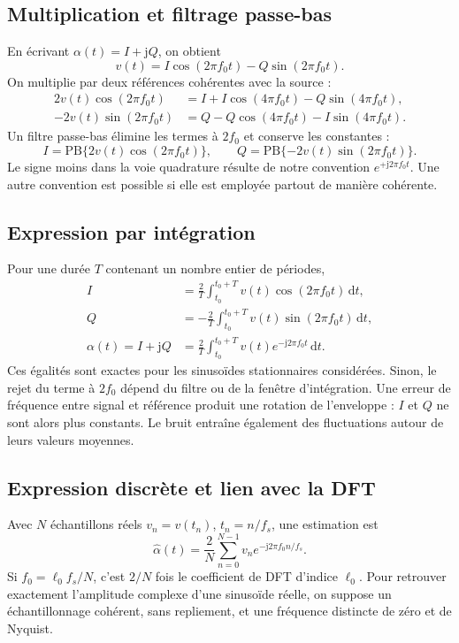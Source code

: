 \documentclass[11pt,a4paper]{article}
\newcommand{\jj}{\mathrm{j}}
\begin{document}
\subsection{Multiplication et filtrage passe-bas}
En écrivant $\alpha(t)=I+\jj Q$, on obtient
\begin{equation}
 v(t)=I\cos(2\pi f_0t)-Q\sin(2\pi f_0t).
\end{equation}
On multiplie par deux références cohérentes avec la source :
\begin{align}
 2v(t)\cos(2\pi f_0t)
 &=I+I\cos(4\pi f_0t)-Q\sin(4\pi f_0t),\\
 -2v(t)\sin(2\pi f_0t)
 &=Q-Q\cos(4\pi f_0t)-I\sin(4\pi f_0t).
\end{align}
Un filtre passe-bas élimine les termes à $2f_0$ et conserve les constantes :
\begin{equation}
 \boxed{I=\mathrm{PB}\{2v(t)\cos(2\pi f_0t)\},\qquad
 Q=\mathrm{PB}\{-2v(t)\sin(2\pi f_0t)\}.}
\end{equation}
Le signe moins dans la voie quadrature résulte de notre convention
$e^{+\jj2\pi f_0t}$. Une autre convention est possible si elle est employée
partout de manière cohérente.

\subsection{Expression par intégration}
Pour une durée $T$ contenant un nombre entier de périodes,
\begin{align}
 I&=\frac{2}{T}\int_{t_0}^{t_0+T}v(t)\cos(2\pi f_0t)\,\mathrm dt,\\
 Q&=-\frac{2}{T}\int_{t_0}^{t_0+T}v(t)\sin(2\pi f_0t)\,\mathrm dt,\\
 \alpha(t)=I+\jj Q
 &=\frac{2}{T}\int_{t_0}^{t_0+T}v(t)e^{-\jj2\pi f_0t}\,\mathrm dt.
\end{align}
Ces égalités sont exactes pour les sinusoïdes stationnaires considérées.
Sinon, le rejet du terme à $2f_0$ dépend du filtre ou de la fenêtre
 d'intégration. Une erreur de fréquence entre signal et référence produit
une rotation de l'enveloppe : $I$ et $Q$ ne sont alors plus constants.
Le bruit entraîne également des fluctuations autour de leurs valeurs moyennes.

\subsection{Expression discrète et lien avec la DFT}
Avec $N$ échantillons réels $v_n=v(t_n)$, $t_n=n/f_s$, une estimation est
\begin{equation}
 \widehat{\alpha}(t)=\frac{2}{N}\sum_{n=0}^{N-1}
 v_n e^{-\jj2\pi f_0 n/f_s}.
\end{equation}
Si $f_0=\ell_0f_s/N$, c'est $2/N$ fois le coefficient de DFT d'indice
$\ell_0$. Pour retrouver exactement l'amplitude complexe d'une sinusoïde
réelle, on suppose un échantillonnage cohérent, sans repliement, et une
fréquence distincte de zéro et de Nyquist.
\end{document}
